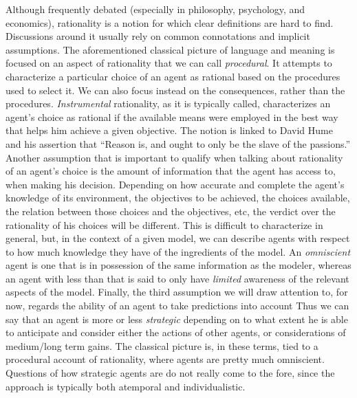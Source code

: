 \documentclass[a4paper]{article}
\begin{document}
Although frequently debated (especially in philosophy, psychology, and economics), rationality is a notion for which clear definitions are hard to find.
Discussions around it usually rely on common connotations and implicit assumptions.
The aforementioned classical picture of language and meaning is focused on an aspect of rationality that we can call \emph{procedural}.
It attempts to characterize a particular choice of an agent as rational based on the procedures used to select it.
We can also focus instead on the consequences, rather than the procedures.
\emph{Instrumental} rationality, as it is typically called, characterizes an agent's choice as rational if the available means were employed in the best way that helps him achieve a given objective.
The notion is linked to David Hume~\parencite*{hume_treatise_1738} and his assertion that ``Reason is, and ought to only be the slave of the passions.''
Another assumption that is important to qualify when talking about rationality of an agent's choice is the amount of information that the agent has access to, when making his decision.
Depending on how accurate and complete the agent's knowledge of its environment, the objectives to be achieved, the choices available, the relation between those choices and the objectives, etc, the verdict over the rationality of his choices will be different.
This is difficult to characterize in general, but, in the context of a given model, we can describe agents with respect to how much knowledge they have of the ingredients of the model.
An \emph{omniscient} agent is one that is in possession of the same information as the modeler, whereas an agent with less than that is said to only have \emph{limited} awareness of the relevant aspects of the model.
Finally, the third assumption we will draw attention to, for now, regards the ability of an agent to take predictions into account
Thus we can say that an agent is more or less \emph{strategic} depending on to what extent he is able to anticipate and consider either the actions of other agents, or considerations of medium/long term gains.
The classical picture is, in these terms, tied to a procedural account of rationality, where agents are pretty much omniscient.
Questions of how strategic agents are do not really come to the fore, since the approach is typically both atemporal and individualistic.
\end{document}

